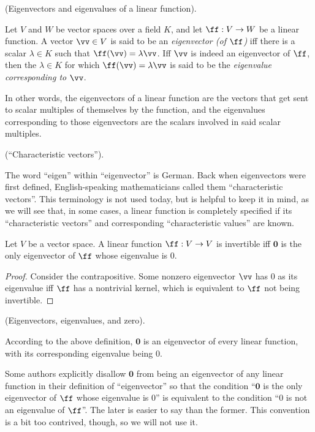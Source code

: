 \begin{defn}
    (Eigenvectors and eigenvalues of a linear function).
    
    Let $V$ and $W$ be vector spaces over a field $K$, and let $\ff:V \rightarrow W$ be a linear function. A vector $\vv \in V$ is said to be an \textit{eigenvector (of $\ff$)} iff there is a scalar $\lambda \in K$ such that $\ff(\vv) = \lambda \vv$. Iff $\vv$ is indeed an eigenvector of $\ff$, then the $\lambda \in K$ for which $\ff(\vv) = \lambda \vv$ is said to be the \textit{eigenvalue corresponding to $\vv$}.
    
    In other words, the eigenvectors of a linear function are the vectors that get sent to scalar multiples of themselves by the function, and the eigenvalues corresponding to those eigenvectors are the scalars involved in said scalar multiples.
\end{defn}

\begin{remark}
    (``Characteristic vectors'').
    
    The word ``eigen'' within ``eigenvector'' is German. Back when eigenvectors were first defined, English-speaking mathematicians called them ``characteristic vectors''. This terminology is not used today, but is helpful to keep it in mind, as we will see that, in some cases, a linear function is completely specified if its ``characteristic vectors'' and corresponding ``characteristic values'' are known.
\end{remark}

\begin{theorem}
    Let $V$ be a vector space. A linear function $\ff:V \rightarrow V$ is invertible iff $\mathbf{0}$ is the only eigenvector of $\ff$ whose eigenvalue is $0$.
\end{theorem}

\begin{proof}
   Consider the contrapositive. Some nonzero eigenvector $\vv$ has $0$ as its eigenvalue iff $\ff$ has a nontrivial kernel, which is equivalent to $\ff$ not being invertible.
\end{proof}

\begin{remark}
    (Eigenvectors, eigenvalues, and zero).
    
    According to the above definition, $\mathbf{0}$ is an eigenvector of every linear function, with its corresponding eigenvalue being $0$. 
    
    Some authors explicitly disallow $\mathbf{0}$ from being an eigenvector of any linear function in their definition of ``eigenvector'' so that the condition ``$\mathbf{0}$ is the only eigenvector of $\ff$ whose eigenvalue is $0$'' is equivalent to the condition ``$0$ is not an eigenvalue of $\ff$''. The later is easier to say than the former. This convention is a bit too contrived, though, so we will not use it.
\end{remark}

